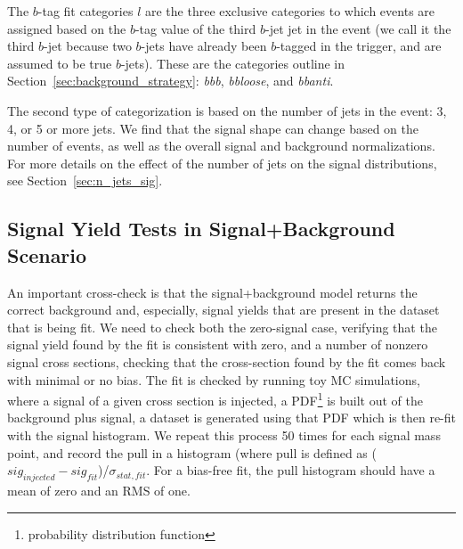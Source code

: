 The $b$-tag fit categories $l$ are the three exclusive categories to which events are assigned
based on the $b$-tag value of the third $b$-jet jet in the event (we call it
the third $b$-jet because two
$b$-jets have already been $b$-tagged in the trigger, and are assumed to be true
$b$-jets).  These are the categories outline in Section~\ref{sec:background_strategy}: 
\textit{bbb}, \textit{bbloose}, and \textit{bbanti}. 




The second type of categorization is based on the number of 
jets in the event: 3, 4, or 5 or more jets.  We find that the signal
shape can change based on the number of events, as well as the overall
signal and background normalizations.  For more details on the effect of 
the number of jets on the signal distributions, see Section~\ref{sec:n_jets_sig}. 



\subsection{Signal Yield Tests in Signal+Background Scenario}
An important cross-check is that the signal+background model returns the correct background
and, especially, signal yields that are present in the dataset that is being fit.
We need to check both the zero-signal case, verifying that the signal yield found
by the fit is consistent with zero, and a number of nonzero signal cross sections,
checking that the cross-section found by the fit comes back with minimal or
no bias.  The fit is checked by running toy MC simulations, where a signal
of a given cross section is injected, a PDF\footnote{probability distribution function} is built out of the background
plus signal, a dataset is generated using that PDF which is then re-fit with the 
signal histogram.  We repeat this process 50 times for each signal mass point, 
and record the pull in a histogram (where pull is defined as ($sig_{injected}-sig_{fit}$)/$\sigma_{stat, fit}$.
For a bias-free fit, the pull histogram should have a mean of zero and an RMS of one.

